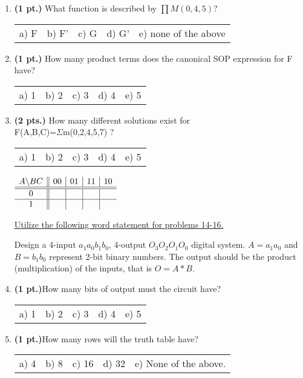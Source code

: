 \documentclass{article}
\begin{document}
\begin{enumerate}
\item {\bf (1 pt.)} What function is described by $\prod M(0,4,5)$?

\begin{tabular}{p{0.7in} p{0.7in} p{0.7in} p{0.7in} l}
a) F & b) F' & c) G & d) G' & e) none of the above
\end{tabular}


\item {\bf (1 pt.)} How many product terms does the canonical SOP expression 
for F have?

\begin{tabular}{p{0.7in} p{0.7in} p{0.7in} p{0.7in} l}
a) 1 & b) 2 & c) 3 & d) 4 & e) 5
\end{tabular}

\item {\bf (2 pts.)} How many different \SOPmin solutions exist for \\
F(A,B,C)=$\Sigma$m(0,2,4,5,7) ?

\begin{tabular}{p{0.7in} p{0.7in} p{0.7in} p{0.7in} l}
a) 1 & b) 2 & c) 3 & d) 4 & e) 5
\end{tabular}

$ \begin{array} {c||c|c|c|c}
        A \backslash BC & 00 & 01 & 11 & 10 \\ \hline \hline
        0        &    &    &    &    \\ \hline
        1        &    &    &    &    \\ 
\end{array} $

\pagebreak

\underline{Utilize the following word statement for problems 14-16.}

Design a 4-input $a_1a_0b_1b_0$, 4-output 
$O_3O_2O_1O_0$ digital system.  $A=a_1a_0$ and $B=b_1b_0$ represent 
2-bit binary numbers.  The output should be the product (multiplication) 
of the inputs, that is $O=A*B$. 

\item {\bf (1 pt.)}How many bits of output must the circuit have?

\begin{tabular}{p{0.7in} p{0.7in} p{0.7in} p{0.7in} l}
a) 1 & b) 2 & c) 3 & d) 4 & e) 5
\end{tabular}

\item {\bf (1 pt.)}How many rows will the truth table have?

\begin{tabular}{p{0.7in} p{0.7in} p{0.7in} p{0.7in} l}
a) 4 & b) 8 & c) 16 & d) 32 & e) None of the above.
\end{tabular}


\end{enumerate}
\end{document}
